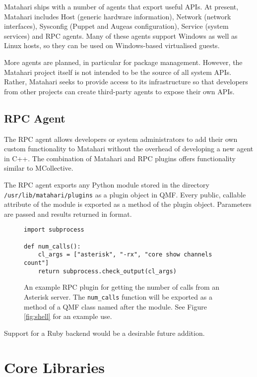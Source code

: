 \documentclass{tufte-handout}
\begin{document}
Matahari ships with a number of agents that export useful APIs. At present, Matahari includes Host (generic hardware information), Network (network interfaces), Sysconfig (Puppet and Augeas configuration), Service (system services) and RPC agents.
Many of these agents support Windows as well as Linux hosts, so they can be used on Windows-based virtualised guests.

More agents are planned, in particular for package management.
However, the Matahari project itself is not intended to be the source of all system APIs. Rather, Matahari seeks to provide access to its infrastructure so that developers from other projects can create third-party agents to expose their own APIs.

\subsection{RPC Agent}

The RPC agent allows developers or system administrators to add their own custom functionality to Matahari without the overhead of developing a new agent in C++. The combination of Matahari and RPC plugins offers functionality similar to MCollective.

The RPC agent exports any Python module stored in the directory \Verb|/usr/lib/matahari/plugins| as a plugin object in QMF. Every public, callable attribute of the module is exported as a method of the plugin object. Parameters are passed and results returned in  format.

\begin{figure}[hb]
\begin{Verbatim}
import subprocess

def num_calls():
    cl_args = ["asterisk", "-rx", "core show channels count"]
    return subprocess.check_output(cl_args)
\end{Verbatim}
\caption{An example RPC plugin for getting the number of calls from an Asterisk server. The \texttt{num\_calls} function will be exported as a method of a QMF class named after the module. See Figure \ref{fig:shell} for an example use.}
\label{fig:rpc}
\end{figure}

Support for a Ruby backend would be a desirable future addition.

\section{Core Libraries}
\end{document}
